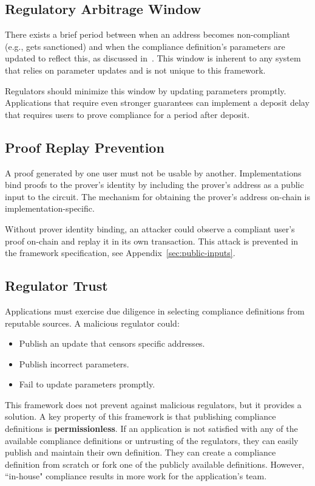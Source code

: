 \documentclass[9pt]{extreport}
\begin{document}
\subsection{Regulatory Arbitrage Window}
\label{sec:arbitrage-window}

There exists a brief period between when an address becomes non-compliant (e.g., gets sanctioned) and when the compliance definition's parameters are updated to reflect this, as discussed in~\cite{hazedaze,buterin2023blockchain}. This window is inherent to any system that relies on parameter updates and is not unique to this framework.

Regulators should minimize this window by updating parameters promptly.  Applications that require even stronger guarantees can implement a deposit delay that requires users to prove compliance for a period after deposit.

\subsection{Proof Replay Prevention}
\label{sec:proof-replay}

A proof generated by one user must not be usable by another. Implementations bind proofs to the prover's identity by including the prover's address as a public input to the circuit. The mechanism for obtaining the prover's address on-chain is implementation-specific.

Without prover identity binding, an attacker could observe a compliant user's proof on-chain and replay it in its own transaction. This attack is prevented in the framework specification, see Appendix~\ref{sec:public-inputs}.

\subsection{Regulator Trust}
\label{sec:regulator-trust}

Applications must exercise due diligence in selecting compliance definitions from reputable sources. A malicious regulator could:

\begin{itemize}
    \item Publish an update that censors specific addresses.
    \item Publish incorrect parameters.
    \item Fail to update parameters promptly.
\end{itemize}

This framework does not prevent against malicious regulators, but it provides a solution.  A key property of this framework is that publishing compliance definitions is \textbf{permissionless}.  If an application is not satisfied with any of the available compliance definitions or untrusting of the regulators, they can easily publish and maintain their own definition.  They can create a compliance definition from scratch or fork one of the publicly available definitions.  However, ``in-house" compliance results in more work for the application's team.
\end{document}
